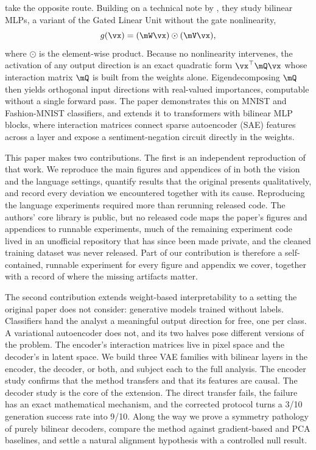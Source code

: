 \documentclass[10pt]{article} %
\begin{document}
\citet{pearce2025bilinear} take the opposite route. Building on a technical note by
\citet{sharkey2023technical}, they study bilinear MLPs, a variant of the Gated Linear
Unit \citep{shazeer2020glu} without the gate nonlinearity,
\begin{equation}
  g(\vx) = (\mW\vx) \odot (\mV\vx),
\end{equation}
where $\odot$ is the element-wise product. Because no nonlinearity intervenes, the
activation of any output direction is an exact quadratic form $\vx^\top \mQ \vx$ whose
interaction matrix $\mQ$ is built from the weights alone. Eigendecomposing $\mQ$ then
yields orthogonal input directions with real-valued importances, computable without a
single forward pass. The paper demonstrates this on MNIST and Fashion-MNIST
classifiers, and extends it to transformers with bilinear MLP blocks, where
interaction matrices connect sparse autoencoder (SAE) features across a layer and
expose a sentiment-negation circuit directly in the weights.

This paper makes two contributions. The first is an independent reproduction of that
work. We reproduce the main figures and appendices of \citet{pearce2025bilinear} in
both the vision and the language settings, quantify results that the original
presents qualitatively, and record every deviation we encountered together with its
cause. Reproducing the language experiments required more than rerunning released
code. The authors' core library is public, but no released code maps the paper's
figures and appendices to runnable experiments, much of the remaining experiment
code lived in an unofficial repository that has since been made private, and the
cleaned training dataset was never released. Part of our contribution is therefore
a self-contained, runnable experiment for every figure and appendix we cover,
together with a record of where the missing artifacts matter.

The second contribution extends weight-based interpretability to a setting the
original paper does not consider: generative models trained without labels.
Classifiers hand the analyst a meaningful output direction for free, one per class.
A variational autoencoder \citep{kingma2014auto} does not, and its two halves pose
different versions of the problem. The encoder's interaction matrices live in pixel
space and the decoder's in latent space. We build three VAE families with bilinear
layers in the encoder, the decoder, or both, and subject each to the full analysis.
The encoder study confirms that the method transfers and that its features are
causal. The decoder study is the core of the extension. The direct transfer fails,
the failure has an exact mathematical mechanism, and the corrected protocol turns a
3/10 generation success rate into 9/10. Along the way we prove a symmetry pathology
of purely bilinear decoders, compare the method against gradient-based and PCA
baselines, and settle a natural alignment hypothesis with a controlled null result.
\end{document}

